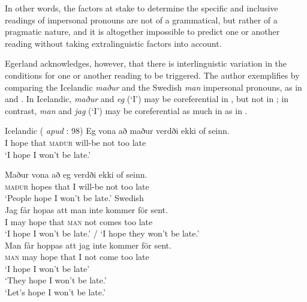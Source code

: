 \documentclass[output=paper]{langscibook}
\begin{document}
In other words, the factors at stake to determine the specific and inclusive readings of impersonal pronouns are not of a grammatical, but rather of a pragmatic nature, and it is altogether impossible to predict one or another reading without taking extralinguistic factors into account.

{Egerland acknowledges, however, that there is interlinguistic variation in the conditions for one or another reading to be triggered. The author exemplifies by comparing the Icelandic} {\textit{maður} }{and the Swedish} {\textit{man} }{impersonal pronouns, as in  and . In Icelandic,} {\textit{maður} }{and} {\textit{eg} }{(‘I’) may be coreferential in , but not in ; in contrast,} {\textit{man} }{and} {\textit{jag} }{(‘I’) may be coreferential as much in  as in .}\pagebreak 


\ea\label{ex:avelar:37}  Icelandic (\citealt{Jónsson1992} \textit{apud} {\citealt{Egerland2003}: 98)}
 \ea\label{ex:avelar:37a}
  \gll Eg vona   að     maður   verdði     ekki of seinn.\\
        I hope     that   \textsc{maður}  will-be   not too late\\
  \glt ‘I hope I won’t be late.’

 \ex\label{ex:avelar:37b} 
  \gll Maður   vona   að eg   verdði     ekki of seinn.\\
         \textsc{maður} hopes   that I   will-be   not too late\\
  \glt ‘People hope I won’t be late.’
\z 
\ex\label{ex:avelar:38}
 \ea\label{ex:avelar:38a} Swedish \citep[98--99]{Egerland2003}\\
  \gll Jag  får     hopas   att     man   inte   kommer   för sent.\\
         I     may   hope   that   \textsc{man}  not   comes     too late\\
  \glt ‘I hope I won’t be late.’ / ‘I hope they won’t be late.’\\
 \ex\label{ex:avelar:38b} 
  \gll Man   får     hoppas   att     jag    inte   kommer   för sent.\\
        \textsc{man}  may   hope     that   I     not   come     too late\\
 \glt ‘I hope I won’t be late’\\ ‘They hope I won’t be late.’\\ ‘Let’s hope I won’t be late.’
 \z 
\z
\end{document}
